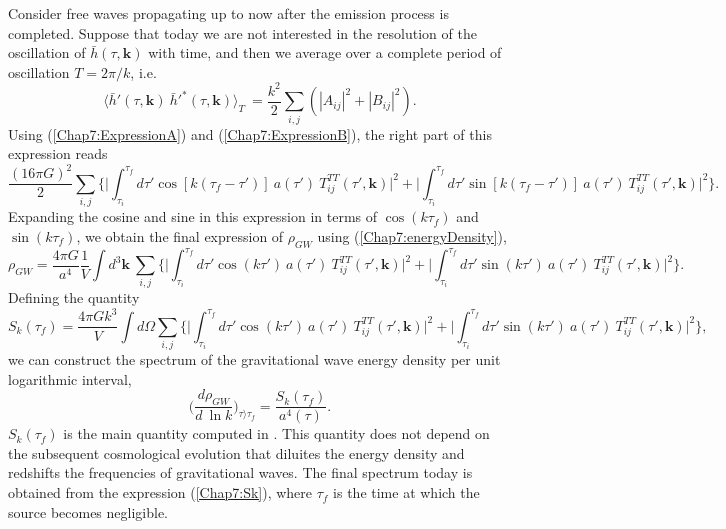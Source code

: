 \documentclass[11pt,a4paper,twoside]{book}
\begin{document}
Consider free waves propagating up to now after the emission process is completed. Suppose that today we are not interested in the resolution of the oscillation of $ \bar{h}(\tau,\textbf{k}) $ with time, and then we average over a complete period of oscillation $ T=2\pi/k $, i.e.
\begin{equation}
\label{Chap7:spectrumh}
\langle \bar{h}'(\tau,\textbf{k})\  \bar{h}'^{*}(\tau,\textbf{k})\rangle _{T}\  = \frac{k^{2}}{2}\sum_{i,j}(|A_{ij}|^{2} + |B_{ij}|^{2}).
\end{equation}
Using (\ref{Chap7:ExpressionA}) and (\ref{Chap7:ExpressionB}), the right part of this expression reads
\begin{equation}
 \frac{(16\pi G)^{2}}{2}\sum_{i,j}\Biggl\{\Bigg|\int_{\tau_{i}}^{\tau_{f}} d\tau'\cos[k(\tau_{f}-\tau')]\ a(\tau')\ T_{ij}^{TT}(\tau', \textbf{k})\Bigg|^{2} + \Bigg|\int_{\tau_{i}}^{\tau_{f}} d\tau'\sin[k(\tau_{f}-\tau')]\ a(\tau')\ T_{ij}^{TT}(\tau', \textbf{k})      \Bigg|^{2}\Biggr\}.
\end{equation}
Expanding the cosine and sine in this expression in terms of $\cos(k\tau_{f})$ and $ \sin(k\tau_{f}) $, we obtain the final expression of $\rho_{GW}$ using (\ref{Chap7:energyDensity}),
\begin{equation}
	\label{Chap7:energyDensityCompleteExpression}
	\rho_{GW}=\frac{4\pi G}{a^{4}}\frac{1}{V}\int d^{3}\textbf{k} \ \sum_{i,j}\Biggl\{\Bigg|\int_{\tau_{i}}^{\tau_{f}} d\tau'\cos(k\tau')\ a(\tau')\ T_{ij}^{TT}(\tau', \textbf{k})\Bigg|^{2} + \Bigg|\int_{\tau_{i}}^{\tau_{f}} d\tau'\sin(k\tau')\ a(\tau')\ T_{ij}^{TT}(\tau', \textbf{k})    \Bigg|^{2}\Biggr\}.
\end{equation}
Defining the quantity
\begin{equation}
\label{Chap7:Sk}
S_{k}(\tau_{f})=\frac{4\pi G k^{3}}{V}\int d\Omega \sum_{i,j}\Biggl\{\Bigg|\int_{\tau_{i}}^{\tau_{f}} d\tau'\cos(k\tau')\ a(\tau')\ T_{ij}^{TT}(\tau', \textbf{k})\Bigg|^{2} + \Bigg|\int_{\tau_{i}}^{\tau_{f}} d\tau'\sin(k\tau')\ a(\tau')\ T_{ij}^{TT}(\tau', \textbf{k})    \Bigg|^{2}\Biggr\},
\end{equation}
we can construct the spectrum of the gravitational wave energy density per unit logarithmic interval,
\begin{equation}
\label{Chap7:EnergyDensityPerUnitLog}
\Bigg(\frac{d \rho_{GW}}{d\ \ln k}\Bigg)_{\tau \rangle  \tau_{f}} = \frac{S_k (\tau_{f})}{a^{4}(\tau)}.
\end{equation}
$ S_{k}(\tau_{f}) $ is the main quantity computed in \cite{Chap7:GreenMethod}. This quantity does not depend on the subsequent cosmological evolution that diluites the energy density and redshifts the frequencies of gravitational waves. The final spectrum today is obtained from the expression (\ref{Chap7:Sk}), where $\tau_{f}$ is the time at which the source becomes negligible.
\end{document}
